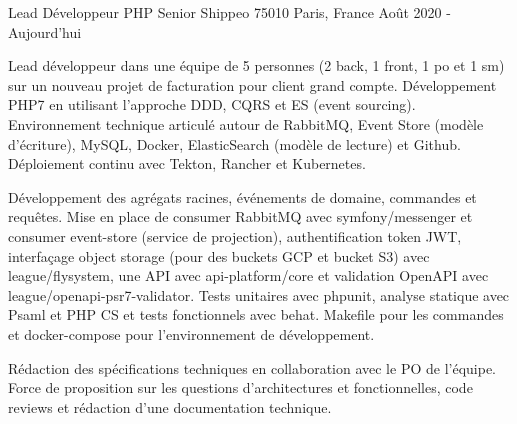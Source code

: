 \cventry
{Lead Développeur PHP Senior} %
{Shippeo} %
{75010 Paris, France} %
{Août 2020 - Aujourd'hui} %
{
\begin{cvitems} %
    \item
    {
        Lead développeur dans une équipe de 5 personnes (2 back, 1 front, 1 po et 1 sm) sur un nouveau projet de facturation
        pour client grand compte. Développement PHP7 en utilisant l'approche DDD, CQRS et ES (event sourcing). Environnement 
        technique articulé autour de RabbitMQ, Event Store (modèle d'écriture), MySQL, Docker, ElasticSearch (modèle de lecture) et Github. 
        Déploiement continu avec Tekton, Rancher et Kubernetes.
    }
    \item
    {
	Développement des agrégats racines, événements de domaine, commandes et requêtes. Mise en place de consumer RabbitMQ 
	avec symfony/messenger et consumer event-store (service de projection), authentification token JWT, interfaçage object 
	storage (pour des buckets GCP et bucket S3) avec league/flysystem, une API avec api-platform/core et validation OpenAPI 
	avec league/openapi-psr7-validator. Tests unitaires avec phpunit, analyse statique avec Psaml et PHP CS et tests fonctionnels avec behat. 
	Makefile pour les commandes et docker-compose pour l'environnement de développement.
    }
    \item
    {
        Rédaction des spécifications techniques en collaboration avec le PO de l'équipe. Force de proposition sur 
        les questions d’architectures et fonctionnelles, code reviews et rédaction d'une documentation technique.
    }
\end{cvitems}
}
